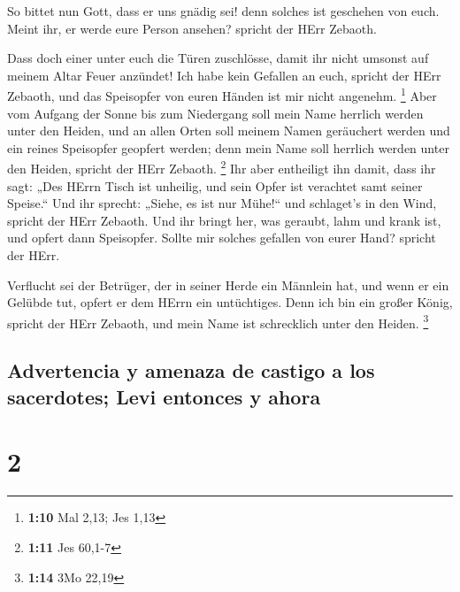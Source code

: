  So bittet nun Gott, dass er uns gnädig sei! denn solches
ist geschehen von euch. Meint ihr, er werde eure Person ansehen? spricht
der HErr Zebaoth.

 Dass doch einer unter euch die Türen zuschlösse, damit
ihr nicht umsonst auf meinem Altar Feuer anzündet! Ich habe kein
Gefallen an euch, spricht der HErr Zebaoth, und das Speisopfer von euren
Händen ist mir nicht angenehm. \footnote{\textbf{1:10} Mal 2,13; Jes
  1,13}  Aber vom Aufgang der Sonne bis zum Niedergang
soll mein Name herrlich werden unter den Heiden, und an allen Orten soll
meinem Namen geräuchert werden und ein reines Speisopfer geopfert
werden; denn mein Name soll herrlich werden unter den Heiden, spricht
der HErr Zebaoth. \footnote{\textbf{1:11} Jes 60,1-7} 
Ihr aber entheiligt ihn damit, dass ihr sagt: „Des HErrn Tisch ist
unheilig, und sein Opfer ist verachtet samt seiner Speise.``
 Und ihr sprecht: „Siehe, es ist nur Mühe!{}`` und
schlaget's in den Wind, spricht der HErr Zebaoth. Und ihr bringt her,
was geraubt, lahm und krank ist, und opfert dann Speisopfer. Sollte mir
solches gefallen von eurer Hand? spricht der HErr.

 Verflucht sei der Betrüger, der in seiner Herde ein
Männlein hat, und wenn er ein Gelübde tut, opfert er dem HErrn ein
untüchtiges. Denn ich bin ein großer König, spricht der HErr Zebaoth,
und mein Name ist schrecklich unter den Heiden. \footnote{\textbf{1:14}
  3Mo 22,19}

\hypertarget{advertencia-y-amenaza-de-castigo-a-los-sacerdotes-levi-entonces-y-ahora}{%
\subsection{Advertencia y amenaza de castigo a los sacerdotes; Levi
entonces y
ahora}\label{advertencia-y-amenaza-de-castigo-a-los-sacerdotes-levi-entonces-y-ahora}}

\hypertarget{section-1}{%
\section{2}\label{section-1}}

